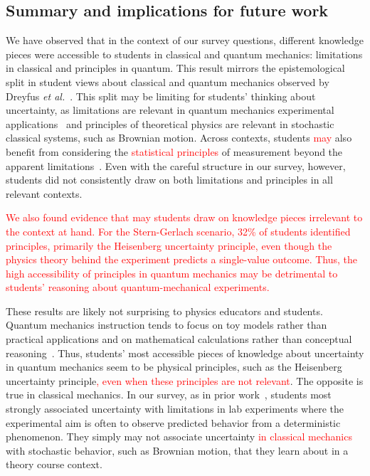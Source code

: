 \documentclass[english,aps,prstper,reprint,showpacs,longbibliography,superscriptaddress,nofootinbib]{revtex4-2}
\begin{document}
\subsection{Summary and implications for future work}

We have observed that in the context of our survey questions, different knowledge pieces were accessible to students in classical and quantum mechanics: limitations in classical and principles in quantum. This result mirrors the epistemological split in student views about classical and quantum mechanics observed by Dreyfus \textit{et al.}~\cite{Dreyfus2019}. This split may be limiting for students' thinking about uncertainty, as limitations are relevant in quantum mechanics experimental applications~\cite{Fox2020} and principles of theoretical physics are relevant in stochastic classical systems, such as Brownian motion. Across contexts, students \textcolor{red}{may} also benefit from considering the \textcolor{red}{statistical principles} of measurement beyond the apparent limitations~\cite{Evangelinos1999,Evangelinos2002,Allie2003,Pillay2008,Buffler2008}. Even with the careful structure in our survey, however, students did not consistently draw on both limitations and  principles in all relevant contexts.

\textcolor{red}{We also found evidence that may students draw on knowledge pieces irrelevant to the context at hand. For the Stern-Gerlach scenario, 32\% of students identified principles, primarily the Heisenberg uncertainty principle, even though the physics theory behind the experiment predicts a single-value outcome. Thus, the high accessibility of principles in quantum mechanics may be detrimental to students' reasoning about quantum-mechanical experiments.}

These results are likely not surprising to physics educators and students. Quantum mechanics instruction tends to focus on toy models rather than practical applications and on mathematical calculations rather than conceptual reasoning~\cite{Johansson2018}. Thus, students' most accessible pieces of knowledge about uncertainty in quantum mechanics seem to be physical principles, such as the Heisenberg uncertainty principle\textcolor{red}{, even when these principles are not relevant}. %
The opposite is true in classical mechanics. In our survey, as in prior work~\cite{Sere1993,Holmes2015}, students most strongly associated uncertainty with limitations in lab experiments where the experimental aim is often to observe predicted behavior from a deterministic phenomenon. They simply may not associate uncertainty \textcolor{red}{in classical mechanics} with stochastic behavior, such as Brownian motion, that they learn about in a theory course context.
\end{document}
